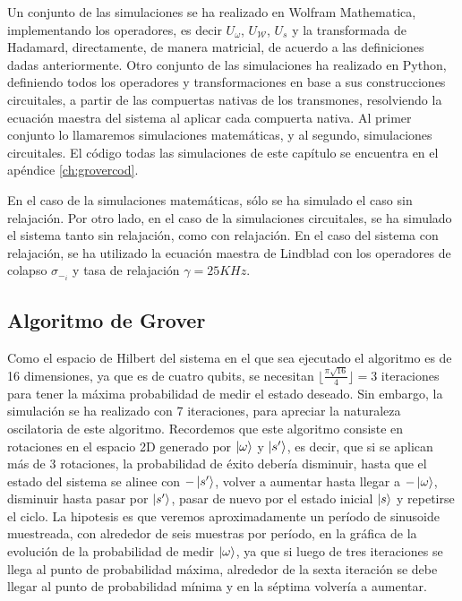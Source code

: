 Un conjunto de las simulaciones se ha realizado en Wolfram Mathematica, implementando los operadores, es decir $U_{\omega}$, $U_\mathcal{W}$, $U_s$ y la transformada de Hadamard, directamente, de manera matricial, de acuerdo a las definiciones dadas anteriormente. Otro conjunto de las simulaciones ha realizado en Python, definiendo todos los operadores y transformaciones en base a sus construcciones circuitales, a partir de las compuertas nativas de los transmones, resolviendo la ecuación maestra del sistema al aplicar cada compuerta nativa. Al primer conjunto lo llamaremos simulaciones matemáticas, y al segundo, simulaciones circuitales. El código todas las simulaciones de este capítulo se encuentra en el apéndice \ref{ch:grovercod}.

En el caso de la simulaciones matemáticas, sólo se ha simulado el caso sin relajación. Por otro lado, en el caso de la simulaciones circuitales, se ha simulado el sistema tanto sin relajación, como con relajación. En el caso del sistema con relajación, se ha utilizado la ecuación maestra de Lindblad con los operadores de colapso $\sigma_{-_i}$ y tasa de relajación $\gamma = 25KHz$.

\subsection{Algoritmo de Grover}

Como el espacio de Hilbert del sistema en el que sea ejecutado el algoritmo es de 16 dimensiones, ya que es de cuatro qubits, se necesitan $\lfloor \frac{\pi \sqrt{16}}{4} \rfloor = 3$ iteraciones para tener la máxima probabilidad de medir el estado deseado. Sin embargo, la simulación se ha realizado con 7 iteraciones, para apreciar la naturaleza oscilatoria de este algoritmo. Recordemos que este algoritmo consiste en rotaciones en el espacio 2D generado por $\ket{\omega}$ y $\ket{s^\prime}$, es decir, que si se aplican más de 3 rotaciones, la probabilidad de éxito debería disminuir, hasta que el estado del sistema se alinee con $- \ket{s^\prime}$, volver a aumentar hasta llegar a $- \ket{\omega}$, disminuir hasta pasar por $\ket{s^\prime}$, pasar de nuevo por el estado inicial $\ket{s}$ y repetirse el ciclo. La hipotesis es que veremos aproximadamente un período de sinusoide muestreada, con alrededor de seis muestras por período, en la gráfica de la evolución de la probabilidad de medir $\ket{\omega}$, ya que si luego de tres iteraciones se llega al punto de probabilidad máxima, alrededor de la sexta iteración se debe llegar al punto de probabilidad mínima y en la séptima volvería a aumentar.


